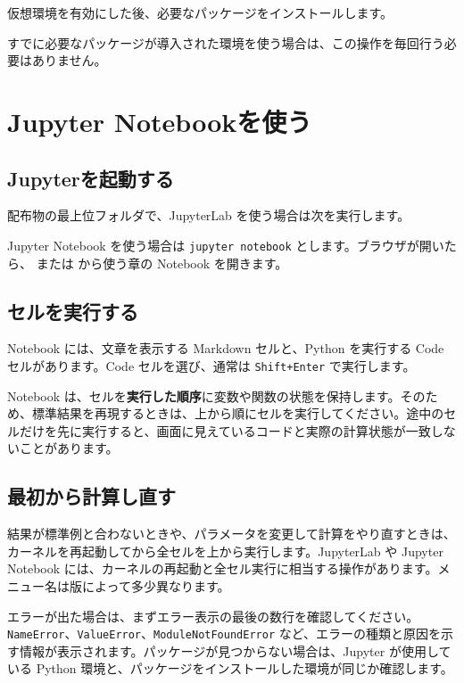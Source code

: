 仮想環境を有効にした後、必要なパッケージをインストールします。


すでに必要なパッケージが導入された環境を使う場合は、この操作を毎回行う必要はありません。

\section{Jupyter Notebookを使う}
\subsection{Jupyterを起動する}

配布物の最上位フォルダで、JupyterLab を使う場合は次を実行します。\cite{jupyter}


Jupyter Notebook を使う場合は \texttt{jupyter notebook} とします。ブラウザが開いたら、 または  から使う章の Notebook を開きます。

\subsection{セルを実行する}

Notebook には、文章を表示する Markdown セルと、Python を実行する Code セルがあります。Code セルを選び、通常は \texttt{Shift+Enter} で実行します。

Notebook は、セルを\textbf{実行した順序}に変数や関数の状態を保持します。そのため、標準結果を再現するときは、上から順にセルを実行してください。途中のセルだけを先に実行すると、画面に見えているコードと実際の計算状態が一致しないことがあります。

\subsection{最初から計算し直す}

結果が標準例と合わないときや、パラメータを変更して計算をやり直すときは、カーネルを再起動してから全セルを上から実行します。JupyterLab や Jupyter Notebook には、カーネルの再起動と全セル実行に相当する操作があります。メニュー名は版によって多少異なります。\cite{jupyter}

エラーが出た場合は、まずエラー表示の最後の数行を確認してください。\texttt{NameError}、\texttt{ValueError}、\texttt{ModuleNotFoundError} など、エラーの種類と原因を示す情報が表示されます。パッケージが見つからない場合は、Jupyter が使用している Python 環境と、パッケージをインストールした環境が同じか確認します。

